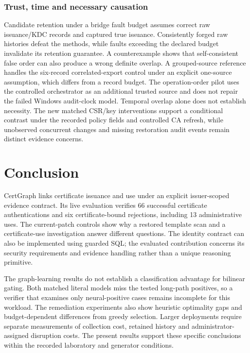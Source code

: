 \subsubsection{Trust, time and necessary causation}
 Candidate retention under a bridge fault budget assumes correct raw issuance/KDC records and captured true issuance. Consistently forged raw histories defeat the methods, while faults exceeding the declared budget invalidate its retention guarantee. A counterexample shows that self-consistent false order can also produce a wrong definite overlap. A grouped-source reference handles the six-record correlated-export control under an explicit one-source assumption, which differs from a record budget. The operation-order pilot uses the controlled orchestrator as an additional trusted source and does not repair the failed Windows audit-clock model. Temporal overlap alone does not establish necessity. The new matched CSR/key interventions support a conditional contrast under the recorded policy fields and controlled CA refresh, while unobserved concurrent changes and missing restoration audit events remain distinct evidence concerns.


\section{Conclusion}
\label{sec:conclusion}
CertGraph links certificate issuance and use under an explicit issuer-scoped evidence contract. Its live evaluation verifies 66 successful certificate authentications and six certificate-bound rejections, including 13 administrative uses. The current-patch controls show why a restored template scan and a certificate-use investigation answer different questions. The identity contract can also be implemented using guarded SQL; the evaluated contribution concerns its security requirements and evidence handling rather than a unique reasoning primitive.

The graph-learning results do not establish a classification advantage for bilinear gating. Both matched literal models miss the tested long-path positives, so a verifier that examines only neural-positive cases remains incomplete for this workload. The remediation experiments also show heuristic optimality gaps and budget-dependent differences from greedy selection. Larger deployments require separate measurements of collection cost, retained history and administrator-assigned disruption costs. The present results support these specific conclusions within the recorded laboratory and generator conditions.

